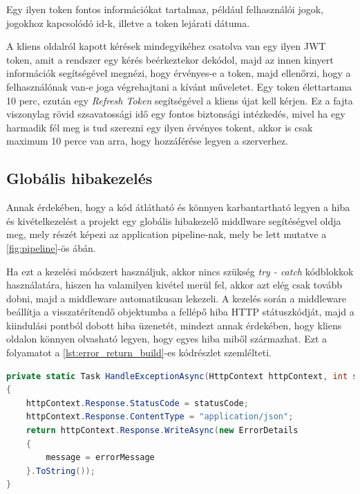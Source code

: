 Egy ilyen token fontos információkat tartalmaz, például felhasználói jogok, jogokhoz kapcsolódó id-k, illetve a token lejárati dátuma. 

A kliens oldalról kapott kérések mindegyikéhez csatolva van egy ilyen JWT token, amit a rendszer egy kérés beérkeztekor dekódol, majd az innen kinyert információk segítségével megnézi, hogy érvényes-e a token, majd ellenőrzi, hogy a felhasználónak van-e joga végrehajtani a kívánt műveletet. Egy token élettartama 10 perc, ezután egy \textit{Refresh Token} segítségével a kliens újat kell kérjen. Ez a fajta viszonylag rövid szsavatossági idő egy fontos biztonsági intézkedés, mivel ha egy harmadik fél meg is tud szerezni egy ilyen érvényes tokent, akkor is csak maximum 10 perce van arra, hogy hozzáférése legyen a szerverhez. 

\subsection{Globális hibakezelés}

Annak érdekében, hogy a kód átlátható és könnyen karbantartható legyen a hiba és kivételkezelést a projekt egy globális hibakezelő middlware segítéségvel oldja meg, mely részét képezi az application pipeline-nak, mely be lett mutatve a \ref{fig:pipeline}-ös ábán.

Ha ezt a kezelési módszert használjuk, akkor nincs szükség \textit{try - catch} kódblokkok használatára, hiszen ha valamilyen kivétel merül fel, akkor azt elég csak tovább dobni, majd a middleware automatikusan lekezeli. A kezelés során a middleware beállítja a visszatérítendő objektumba a fellépő hiba HTTP státuszkódját, majd a kiindulási pontból dobott hiba üzenetét, mindezt annak érdekében, hogy kliens oldalon könnyen olvasható legyen, hogy egyes hiba miből származhat. Ezt a folyamatot a \ref{lst:error_return_build}-es kódrészlet szemlélteti.

\begin{lstlisting}[language=C#, caption={A visszatérítendő válasz felépítése}, label={lst:error_return_build}]
private static Task HandleExceptionAsync(HttpContext httpContext, int statusCode, string errorMessage)
{
    httpContext.Response.StatusCode = statusCode;
    httpContext.Response.ContentType = "application/json";
    return httpContext.Response.WriteAsync(new ErrorDetails
    {
        message = errorMessage
    }.ToString());
}
\end{lstlisting}

\newpage

